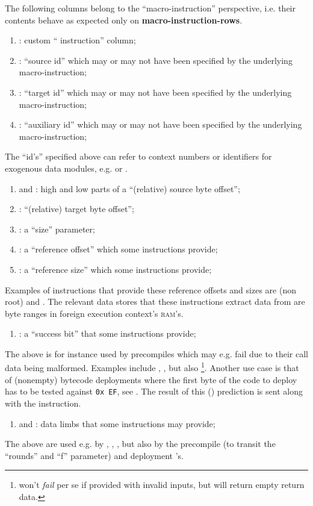 The following columns belong to the ``macro-instruction'' perspective, i.e. their contents behave as expected only on 
\textbf{macro-instruction-rows}. 
\begin{enumerate}
	\item \macroInst{}:
		custom ``\mmuMod{} instruction'' column;
	\item \macroSrcId{}:
		``source id'' which may or may not have been specified by the underlying macro-instruction;
	\item \macroTgtId{}:
		``target id'' which may or may not have been specified by the underlying macro-instruction;
	\item \macroAuxId{}:
		``auxiliary id'' which may or may not have been specified by the underlying macro-instruction;
\end{enumerate}
The ``id's'' specified above can refer to context numbers or identifiers for exogenous data modules, e.g. \kecStamp{} or \cfi{}.
\begin{enumerate}[resume]
	\item \macroSrcOffsetHi{} and \macroSrcOffsetLo{}:
		high and low parts of a ``(relative) source byte offset'';
	\item \macroTgtOffsetLo{}:
		``(relative) target byte offset'';
	\item \macroSize{}:
		a ``size'' parameter;
	\item \macroRefOffset{}:
		a ``reference offset'' which some instructions provide;
	\item \macroRefSize{}:  
		a ``reference size'' which some instructions provide;
\end{enumerate}
Examples of instructions that provide these reference offsets and sizes are (non root)  and .
The relevant data stores that these instructions extract data from are byte ranges in foreign execution context's \textsc{ram}'s.
\begin{enumerate}[resume]
	\item \macroSuccessBit{}:
		a ``success bit'' that some instructions provide;
\end{enumerate}
The above is for instance used by precompiles which may e.g. fail due to their call data being malformed.
Examples include \instEcadd{}, \instEcmul{}, \instEcpairing{} but also \instEcrecover{}\footnote{\instEcrecover{} won't \emph{fail} per se if provided with invalid inputs, but will return empty return data.}.
Another use case is that of (nonempty) bytecode deployments where the first byte of the code to deploy has to be tested against \texttt{0x\,EF},
see \cite{EIP-3541}.
The result of this (\hubMod{}) prediction is sent along with the \mmuMod{} instruction.
\begin{enumerate}[resume]
	\item \macroLimbOne{} and \macroLimbTwo{}:
		data limbs that some instructions may provide;
\end{enumerate}
The above are used e.g. by
,
,
,
but also by the \instBlake{} precompile (to transit the ``rounds'' and ``f'' parameter)
and deployment 's.

